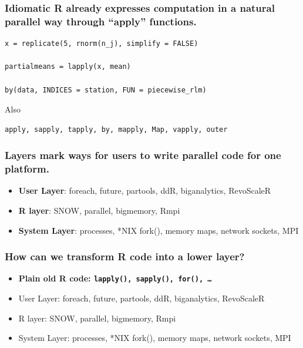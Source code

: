 \documentclass{beamer}
\begin{document}
\begin{frame}[fragile]

    \frametitle{Idiomatic R already expresses computation in a natural
    parallel way through ``apply'' functions.}

\begin{verbatim}
x = replicate(5, rnorm(n_j), simplify = FALSE)

partialmeans = lapply(x, mean)

by(data, INDICES = station, FUN = piecewise_rlm)
\end{verbatim}

Also
\begin{verbatim}
apply, sapply, tapply, by, mapply, Map, vapply, outer
\end{verbatim}

\end{frame}
\begin{frame}

    \frametitle{Layers mark ways for users to write parallel code for one
    platform.}

\begin{itemize}
    \item \textbf{User Layer}: foreach, future, partools, ddR, biganalytics, RevoScaleR
    \item \textbf{R layer}: SNOW, parallel, bigmemory, Rmpi
    \item \textbf{System Layer}: processes, *NIX fork(), memory maps, network sockets,
    MPI
\end{itemize}

\end{frame}
\begin{frame}

    \frametitle{How can we transform R code into a lower layer?}

\begin{itemize}
    \item \textbf{Plain old R code: \texttt{lapply(), sapply(), for(), \dots}}
\item User Layer: foreach, future, partools, ddR, biganalytics, RevoScaleR
\item R layer: SNOW, parallel, bigmemory, Rmpi
\item System Layer: processes, *NIX fork(), memory maps, network sockets,
    MPI
\end{itemize}


%
%
%
%
%

\end{frame}
\end{document}
